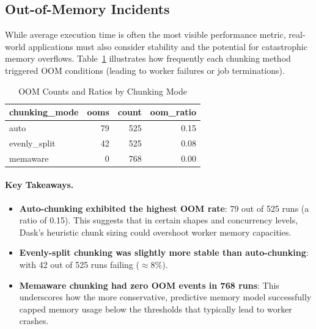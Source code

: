 \subsection{Out-of-Memory Incidents}
\label{subsec:oom-results}

While average execution time is often the most visible performance metric, real-world applications must also consider stability and the potential for catastrophic memory overflows.
Table~\ref{tab:oom_stats} illustrates how frequently each chunking method triggered \ac{OOM} conditions (leading to worker failures or job terminations).

\begin{table}[ht]
    \centering
    \caption{\ac{OOM} Counts and Ratios by Chunking Mode}
    \label{tab:oom_stats}
    \begin{tabular}{lrrr}
        \toprule
        \textbf{chunking\_mode} & \textbf{ooms} & \textbf{count} & \textbf{oom\_ratio} \\
        \midrule
        auto                    & 79            & 525            & 0.15                \\
        evenly\_split           & 42            & 525            & 0.08                \\
        memaware                & 0             & 768            & 0.00                \\
        \bottomrule
    \end{tabular}
\end{table}

\paragraph{Key Takeaways.}
\begin{itemize}
    \item \textbf{Auto-chunking exhibited the highest \ac{OOM} rate}: 79 out of 525 runs (a ratio of 0.15). This suggests that in certain shapes and concurrency levels, Dask's heuristic chunk sizing could overshoot worker memory capacities.
    \item \textbf{Evenly-split chunking was slightly more stable than auto-chunking}: with 42 out of 525 runs failing (\(\approx 8\%\)).
    \item \textbf{Memaware chunking had zero \ac{OOM} events in 768 runs}: This underscores how the more conservative, predictive memory model successfully capped memory usage below the thresholds that typically lead to worker crashes.
\end{itemize}

